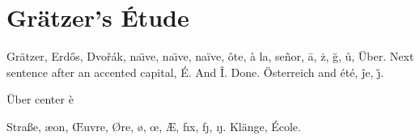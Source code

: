\documentclass{article}
\begin{document}
\section{Gr\"{a}tzer's \'Etude}
Gr\"atzer, Erd\H{o}s, Dvo\v{r}\'ak, na\"\i ve, na\"{\i}ve, na\"ive, \^{o}te, \`a la, se\~nor, \=a, \.{z}, \u{g}, \r{u}, \"Uber. Next sentence after an accented capital, \'E. And \^I. Done.
\"{O}sterreich and \'{e}t\'{e}, \^{j}e, \v{\j}.
\begin{center}
\"Uber center \`e
\end{center}
Stra\ss e, \ae on, \OE uvre, \O re, \o, \oe, \AE, f\i x, f\j, \i\j.
{\small Kl\"{a}nge, \'{E}cole.}
\end{document}
